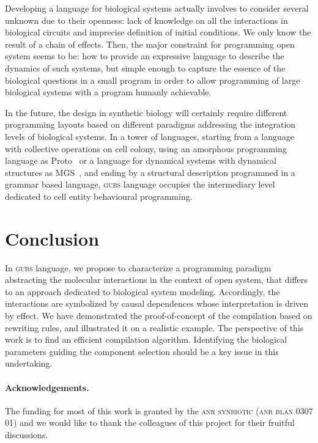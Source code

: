 \documentclass{eptcs}
\newcounter{ti}
\begin{document}
Developing a language for biological systems actually involves to consider several unknown due to their openness: lack of knowledge on all the interactions in biological circuits and imprecise definition of initial conditions. We only know the result of a chain of effects. Then, the major constraint for programming open system seems to be: how to provide an expressive language to describe the dynamics of such systems, but simple enough to capture the essence of the biological questions in a small program in order to allow programming of large biological systems with a program humanly achievable.

In the future, the design in synthetic biology will certainly require different programming layouts based on different paradigms addressing the integration levels of biological systems. In a tower of languages, starting from a language with collective operations on cell colony, using an amorphous programming language as Proto~\cite{Beal2011} or a language for dynamical systems with dynamical structures as MGS~\cite{Spicher2005}, and ending by a structural description programmed in a grammar based language, \textsc{gubs} language occupies the intermediary level dedicated to cell entity behavioural programming. 


\section{Conclusion}
\label{sec:conclusion}
In \textsc{gubs} language, we propose to characterize a programming paradigm abstracting the molecular interactions in the context of open system, that differs to an approach dedicated to biological system modeling. Accordingly, the interactions are symbolized by causal dependences whose interpretation is driven by effect. We have demonstrated the proof-of-concept of the compilation based on rewriting rules, and illustrated it on a realistic example. The perspective of this work is to find an efficient compilation algorithm. 
Identifying the biological parameters guiding the component selection should be a key issue in this undertaking.

\paragraph{Acknowledgements.}
The funding for most of this work is granted by the \textsc{anr synbiotic} (\textsc{anr blan} 0307 01) and we would like to thank the colleagues of this project for their fruitful discussions. 

	
\end{document}
